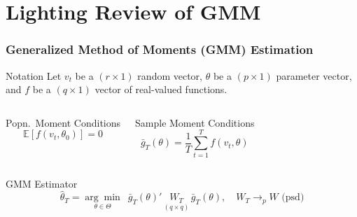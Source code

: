 \section{Lighting Review of GMM}
\begin{frame}
  \frametitle{Generalized Method of Moments (GMM) Estimation}

  \begin{block}{Notation}
  Let $v_t$ be a $(r\times 1)$ random vector, $\theta$ be a $(p\times 1)$ parameter vector, and $f$ be a $(q\times 1)$ vector of real-valued functions.
\end{block}

  \begin{columns}
    \begin{block}{Popn.\ Moment Conditions}
      \vspace{-1em}
      \[
        \mathbb{E}\left[ f(v_t, \theta_0) \right] = 0
      \]
    \end{block}

    \begin{block}{Sample Moment Conditions}
      \vspace{-1em}
      \[
        \bar{g}_T(\theta) = \frac{1}{T}\sum_{t=1}^T f(v_t, \theta)
      \]
    \end{block}
  \end{columns}

  \begin{block}{GMM Estimator}
    \vspace{-1em}
    \[
      \widehat{\theta}_T = \underset{\theta \in \Theta}{\arg \min} \,\,\, \bar{g}_T(\theta)' \, \underset{(q\times q)}{W_T} \, \bar{g}_T(\theta), \quad W_T \rightarrow_p W \mbox{ (psd)}
    \]
  \end{block}

\end{frame}

